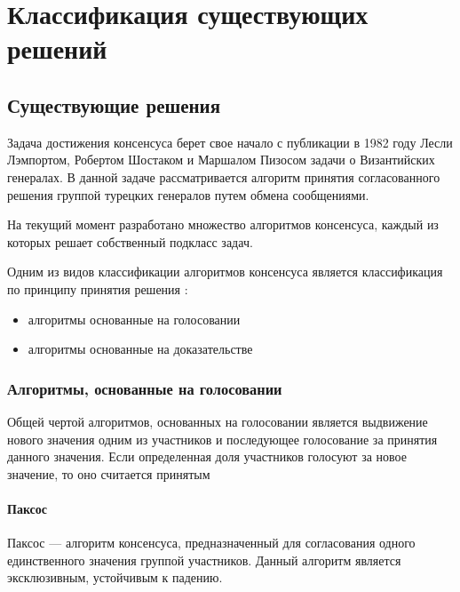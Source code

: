 \chapter{Классификация существующих решений}

    \section{Существующие решения}

        Задача достижения консенсуса берет свое начало с публикации в 1982 году Лесли Лэмпортом, Робертом Шостаком и Маршалом Пизосом задачи о Византийских генералах\cite{lamportbft}. В данной задаче рассматривается алгоритм принятия согласованного решения группой турецких генералов путем обмена сообщениями.

        На текущий момент разработано множество алгоритмов консенсуса, каждый из которых решает собственный подкласс задач.
        
        Одним из видов классификации алгоритмов консенсуса является классификация по принципу принятия решения \cite{nguyen2018survey}: 
        
        \begin{itemize}
            \item алгоритмы основанные на голосовании
            \item алгоритмы основанные на доказательстве
        \end{itemize}

        \subsection{Алгоритмы, основанные на голосовании}

            Общей чертой алгоритмов, основанных на голосовании является выдвижение нового значения одним из участников и последующее голосование за принятия данного значения. Если определенная доля участников голосуют за новое значение, то оно считается принятым

            \subsubsection{Паксос}
            
                Паксос\cite{lamport2001paxos} --- алгоритм консенсуса, предназначенный для согласования одного единственного значения группой участников. Данный алгоритм является эксклюзивным, устойчивым к падению.
                

